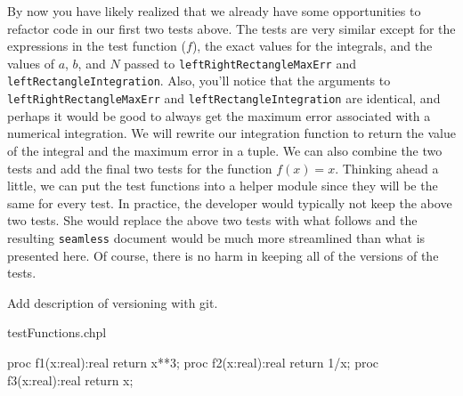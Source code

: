 \begin{seamlessnote}
  By now you have likely realized that we already have some opportunities to refactor code in
  our first two tests above. The tests are very similar except for the expressions in the 
  test function ($f$), the exact values for the integrals, and the values of $a$, $b$, and $N$
  passed to \lstinline{leftRightRectangleMaxErr} and \lstinline{leftRectangleIntegration}.
  Also, you'll notice that the arguments to 
  \lstinline{leftRightRectangleMaxErr} and \lstinline{leftRectangleIntegration}
  are identical, and perhaps it would be good to always get the maximum error associated with a
  numerical integration.
  We will rewrite our integration function to return the value of the integral and
  the maximum error in a tuple. 
  We can also combine the two tests and add the final two tests for the function $f(x) = x$.
  Thinking ahead a little, we can put the test functions into a helper module since they will
  be the same for every test.
  In practice, the developer would typically not keep the above two tests. She would 
  replace the above two tests with what follows and the resulting \lstinline{seamless} 
  document would be much more streamlined than what is presented here. Of course, there is no 
  harm in keeping all of the versions of the tests.
\end{seamlessnote}

\begin{TODO}
  Add description of versioning with git.
\end{TODO}

\begin{chapelhelper}{testFunctions.chpl}
  \begin{chapel}
    proc f1(x:real):real {
      return x**3;
    } 
    proc f2(x:real):real {
      return 1/x;
    } 
    proc f3(x:real):real {
      return x;
    } 
  \end{chapel}
\end{chapelhelper}

